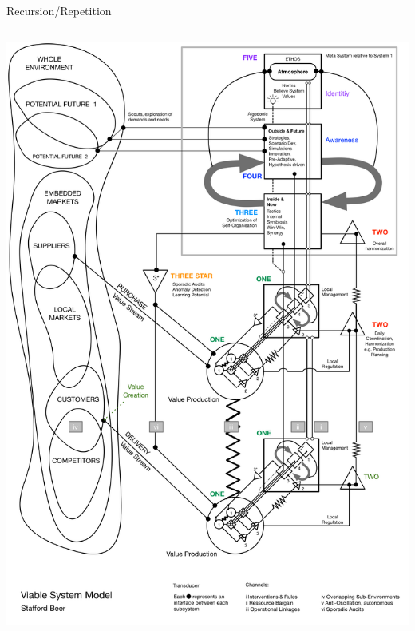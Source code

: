 \documentclass[
	11pt,
	aspectratio=169,
]{beamer}
\begin{document}
\begin{frame}{Recursion/Repetition}
\begin{columns}
                         \centering\includegraphics[height=0.75\textheight]{resources/VSM.png}
                    \end{columns}
                \end{frame}
\end{document}

